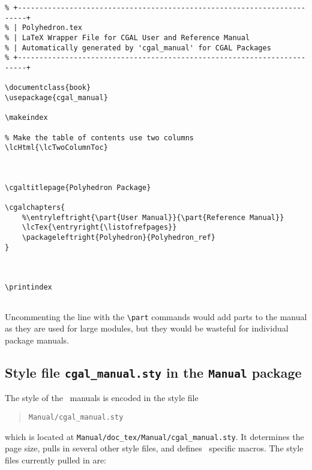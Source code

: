 \begin{verbatim}
% +------------------------------------------------------------------------+
% | Polyhedron.tex
% | LaTeX Wrapper File for CGAL User and Reference Manual
% | Automatically generated by 'cgal_manual' for CGAL Packages
% +------------------------------------------------------------------------+

\documentclass{book}
\usepackage{cgal_manual}

\makeindex

% Make the table of contents use two columns
\lcHtml{\lcTwoColumnToc}



\cgaltitlepage{Polyhedron Package}

\cgalchapters{
    %\entryleftright{\part{User Manual}}{\part{Reference Manual}}
    \lcTex{\entryright{\listofrefpages}}
    \packageleftright{Polyhedron}{Polyhedron_ref}
}



\printindex


\end{verbatim}

Uncommenting the line with the \verb|\part| commands would add parts
to the manual as they are used for large modules, but they would be
wasteful for individual package manuals.

\subsection{Style file \texttt{cgal\_manual.sty} in the
  \texttt{Manual} package}
\label{subsec:manual_style_files}

The style of the \cgal\ manuals is encoded in the style file

\begin{quote}
    \texttt{Manual/cgal\_manual.sty}
\end{quote}

which is located at \texttt{Manual/doc\_tex/Manual/cgal\_manual.sty}.
It determines the page size, pulls in several other style files, and
defines \cgal\ specific macros. The style files currently pulled in
are:

